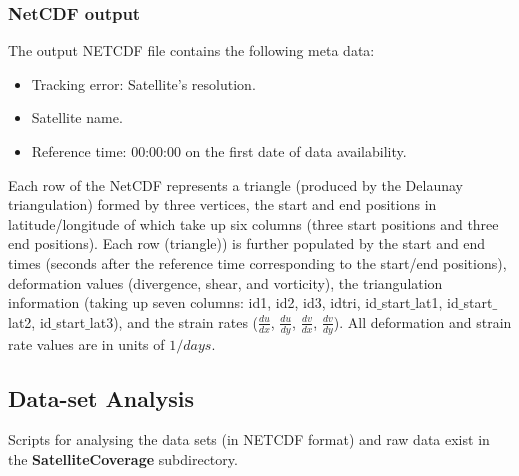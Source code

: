 \documentclass{article}
\newcommand{\ode}[2]{\frac{d #1}{d #2}}
\begin{document}
    \subsubsection*{NetCDF output}

    The output NETCDF file contains the following meta data:

    \begin{itemize}
        \item Tracking error: Satellite's resolution.
        \item Satellite name.
        \item Reference time: 00:00:00 on the first date of data availability.
    \end{itemize}

    Each row of the NetCDF represents a triangle (produced by the Delaunay triangulation) formed by three vertices, the start and end positions in latitude/longitude of which take up six columns (three start positions and three end positions). Each row (triangle)) is further populated by the start and end times (seconds after the reference time corresponding to the start/end positions), deformation values (divergence, shear, and vorticity), the triangulation information (taking up seven columns: id1, id2, id3, idtri, id$\_$start$\_$lat1, id$\_$start$\_$lat2, id$\_$start$\_$lat3), and the strain rates ($\ode{u}{x}$, $\ode{u}{y}$, $\ode{v}{x}$, $\ode{v}{y}$). All deformation and strain rate values are in units of $1/days$.

    \subsection{Data-set Analysis}\label{structure}

        Scripts for analysing the data sets (in NETCDF format) and raw data exist in the \textbf{SatelliteCoverage} subdirectory.
\end{document}
